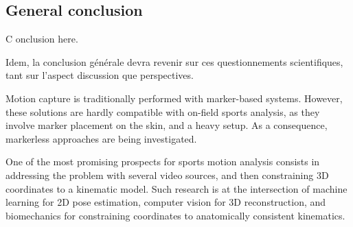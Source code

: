 

{} \mtcaddchapter
{}

\vspace*{-1cm}
\begin{flushright}
\section*{\fontsize{20pt}{20pt}\selectfont\textnormal{General conclusion}}
\end{flushright}
\vspace{2cm}

\chead[\fancyplain{}{}]
      {\fancyplain{}{}}
\lfoot[\fancyplain{}{}]
      {\fancyplain{}{}}
\cfoot[\fancyplain{}{\thepage}]
      {\fancyplain{}{\thepage}}
\rfoot[\fancyplain{}{}]
     {\fancyplain{}{\scriptsize}}


\lettrine[lines=1]{C}{ }onclusion here.

Idem, la conclusion générale devra revenir sur ces questionnements scientifiques, tant sur l'aspect discussion que perspectives.

Motion capture is traditionally performed with marker-based systems. However, these solutions are hardly compatible with on-field sports analysis, as they involve marker placement on the skin, and a heavy setup. As a consequence, markerless approaches are being investigated. 

One of the most promising prospects for sports motion analysis consists in addressing the problem with several video sources, and then constraining 3D coordinates to a kinematic model. Such research is at the intersection of machine learning for 2D pose estimation, computer vision for 3D reconstruction, and biomechanics for constraining coordinates to anatomically consistent kinematics. 

